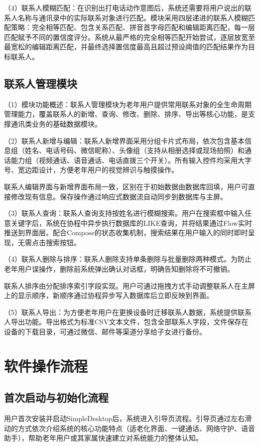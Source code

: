 （4）联系人模糊匹配：在识别出打电话动作意图后，系统还需要将用户说出的联系人名称与通讯录中的实际联系对象进行匹配。模块采用四层递进的联系人模糊匹配策略：完全相等匹配、包含关系匹配、拼音首字母匹配和编辑距离匹配，每一层匹配赋予不同的置信度评分。系统从最严格的完全相等匹配开始尝试，逐层放宽至最宽松的编辑距离匹配，并最终选择置信度最高且超过预设阈值的匹配结果作为目标联系人。



\subsection{联系人管理模块}
（1）模块功能概述：联系人管理模块为老年用户提供常用联系对象的全生命周期管理能力，覆盖联系人的新增、查询、修改、删除、排序、导出等核心功能，是支撑通讯类业务的基础数据模块。

（2）联系人新增与编辑：联系人新增界面采用分组卡片式布局，依次包含基本信息组（姓名、电话号码、微信昵称）、头像组（支持从相册选择或现场拍照）和通话能力组（视频通话、语音通话、电话直拨三个开关）。所有输入控件均采用大字号、宽边距设计，方便老年用户的视觉辨识与触摸操作。

联系人编辑界面与新增界面布局一致，区别在于初始数据由数据库回填，用户可直接修改现有信息。保存操作通过响应式数据流自动同步到数据库与主屏。

（3）联系人查询：联系人查询支持按姓名进行模糊搜索。用户在搜索框中输入任意关键字后，系统在协程中异步执行数据库的LIKE查询，并将结果通过Flow实时推送到界面层。配合Compose的状态收集机制，搜索结果在用户输入的同时即时呈现，无需点击搜索按钮。

（4）联系人删除与排序：联系人删除支持单条删除与批量删除两种模式。为防止老年用户误操作，删除前系统弹出确认对话框，明确告知删除将不可撤销。

联系人排序由分配排序索引字段实现。用户可通过拖拽方式手动调整联系人在主屏上的显示顺序，新顺序通过协程异步写入数据库后立即反映到界面。

（5）联系人导出：为方便老年用户在更换设备时迁移联系人数据，系统提供联系人导出功能。导出格式为标准CSV文本文件，包含全部联系人字段，文件保存在设备的下载目录，可通过微信、邮件等渠道分享给子女进行备份。

\section{软件操作流程}

\subsection{首次启动与初始化流程}
用户首次安装并启动SimpleDesktop后，系统进入引导页流程。引导页通过左右滑动的方式依次介绍系统的核心功能特点（适老化界面、一键通话、网络守护、语音助手），帮助老年用户或其家属快速建立对系统能力的整体认知。


